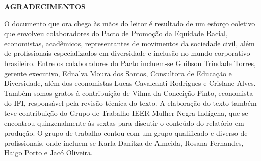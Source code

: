 \begin{center}
    \large
    \textbf{AGRADECIMENTOS}
\end{center}
\begingroup
\small
\begin{spacing}{1.0}

\par O documento que ora chega às mãos do leitor é resultado de um esforço coletivo que envolveu colaboradores do Pacto de Promoção da Equidade Racial, economistas, acadêmicos,  representantes de movimentos da sociedade civil, além de profissionais especializados em diversidade e inclusão no mundo corporativo brasileiro. Entre os colaboradores do Pacto incluem-se Guibson Trindade Torres, gerente executivo, Ednalva Moura dos Santos, Consultora de Educação e Diversidade, além dos economistas Lucas Cavalcanti Rodrigues e Crislane Alves. Também somos gratos à contribuição de Vilma da Conceição Pinto, economista do IFI, responsável pela revisão técnica do texto. A elaboração do texto também teve contribuição do Grupo de Trabalho IEER Mulher Negra-Indígena, que se encontrou quinzenalmente às sextas para discutir o conteúdo do relatório em produção. O grupo de trabalho contou com um grupo qualificado e diverso de profissionais, onde incluem-se Karla Danitza de Almeida, Rosana Fernandes, Haigo Porto e Jacó Oliveira.

\end{spacing}

\endgroup
\thispagestyle{empty}
\clearpage